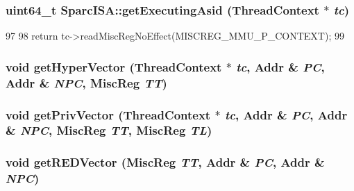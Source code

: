 \label{namespaceSparcISA_a3f9560369e934be05b1dd8f23fbd6104}
\hypertarget{namespaceSparcISA_a01ed5c632599d5d874461f3251873236}{
\subsubsection[{getExecutingAsid}]{\setlength{\rightskip}{0pt plus 5cm}uint64\_\-t SparcISA::getExecutingAsid ({\bf ThreadContext} $\ast$ {\em tc})}}
\label{namespaceSparcISA_a01ed5c632599d5d874461f3251873236}



\begin{DoxyCode}
97 {
98     return tc->readMiscRegNoEffect(MISCREG_MMU_P_CONTEXT);
99 }
\end{DoxyCode}
\hypertarget{namespaceSparcISA_a56dcbc48848c13640127fdef50b12bf7}{
\subsubsection[{getHyperVector}]{\setlength{\rightskip}{0pt plus 5cm}void getHyperVector ({\bf ThreadContext} $\ast$ {\em tc}, \/  {\bf Addr} \& {\em PC}, \/  {\bf Addr} \& {\em NPC}, \/  MiscReg {\em TT})}}
\label{namespaceSparcISA_a56dcbc48848c13640127fdef50b12bf7}
\hypertarget{namespaceSparcISA_a2fa7898cfa4407a5ae9e3ae734d6378b}{
\subsubsection[{getPrivVector}]{\setlength{\rightskip}{0pt plus 5cm}void getPrivVector ({\bf ThreadContext} $\ast$ {\em tc}, \/  {\bf Addr} \& {\em PC}, \/  {\bf Addr} \& {\em NPC}, \/  MiscReg {\em TT}, \/  MiscReg {\em TL})}}
\label{namespaceSparcISA_a2fa7898cfa4407a5ae9e3ae734d6378b}
\hypertarget{namespaceSparcISA_a49dee5cc438e190bcdb1756438219536}{
\subsubsection[{getREDVector}]{\setlength{\rightskip}{0pt plus 5cm}void getREDVector (MiscReg {\em TT}, \/  {\bf Addr} \& {\em PC}, \/  {\bf Addr} \& {\em NPC})}}
